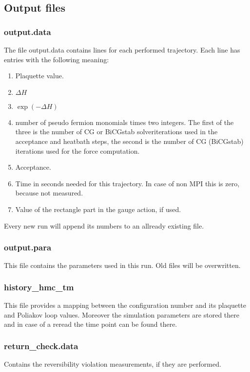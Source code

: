 \subsection{Output files}

\subsubsection*{\ttfamily output.data}

The file {\ttfamily output.data} contains lines for each performed
trajectory. Each line has entries with the following meaning:
\begin{enumerate}
\item Plaquette value.
\item $\Delta H$
\item $\exp(-\Delta H)$
\item number of pseudo fermion monomials times two integers. The first
  of the three is the number of CG or BiCGstab solveriterations used
  in the acceptance and heatbath steps, the second is the number of CG
  (BiCGstab) iterations used for the force computation.
\item Acceptance.
\item Time in seconds needed for this trajectory. In case of non MPI
  this is zero, because not measured.
\item Value of the rectangle part in the gauge action, if used.
\end{enumerate}
Every new run will append its numbers to an allready existing file.

\subsubsection*{\ttfamily output.para}
This file contains the parameters used in this run. Old files will be
overwritten. 

\subsubsection*{\ttfamily history\_hmc\_tm}
This file provides a mapping between the configuration number and its
plaquette and Poliakov loop values. Moreover the simulation parameters
are stored there and in case of a reread the time point can be found there. 

\subsubsection*{\ttfamily return\_check.data}
Contains the reversibility violation measurements, if they are
performed. 

